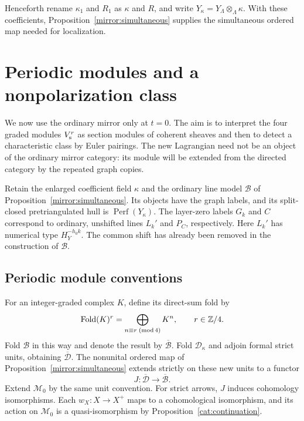 \documentclass[11pt]{article}
\theoremstyle{definition}
\theoremstyle{remark}
\newcommand{\Z}{\mathbb Z}
\DeclareMathOperator{\Perf}{Perf}
\numberwithin{equation}{section}
\begin{document}
Henceforth rename $\kappa_1$ and $R_1$ as $\kappa$ and $R$, and
write $Y_\kappa=Y_\Lambda\otimes_\Lambda\kappa$.  With these
coefficients, Proposition~\ref{mirror:simultaneous} supplies the
simultaneous ordered map needed for localization.

\section{Periodic modules and a nonpolarization class}
\label{per:section}

We now use the ordinary mirror only at $t=0$.  The aim is to interpret
the four graded modules $V_{\rm s}^r$ as section modules of coherent
sheaves and then to detect a characteristic class by Euler pairings.
The new Lagrangian need not be an object of the ordinary mirror
category: its module will be extended from the directed category by
the repeated graph copies.

Retain the enlarged coefficient field $\kappa$ and the ordinary line
model $\mathcal B$ of Proposition~\ref{mirror:simultaneous}.  Its objects
have the graph labels, and its split-closed pretriangulated hull is
$\Perf(Y_\kappa)$.  The layer-zero labels $G_k$ and $C$ correspond to
ordinary, unshifted lines $L_k'$ and $P_C$, respectively.  Here $L_k'$
has numerical type $H_Y^{-h_0k}$.  The common shift has already been
removed in the construction of $\mathcal B$.

\subsection{Periodic module conventions}

For an integer-graded complex $K$, define its direct-sum fold by
\begin{equation}
 \operatorname{Fold}(K)^r
   =\bigoplus_{n\equiv r\;({\rm mod}\,4)}K^n,
 \qquad r\in\Z/4.
 \label{per:fold}
\end{equation}
Fold $\mathcal B$ in this way and denote the result by
$\overline{\mathcal B}$.  Fold $\mathcal D_\kappa$ and adjoin formal
strict units, obtaining $\overline{\mathcal D}$.  The nonunital ordered
map of Proposition~\ref{mirror:simultaneous} extends strictly on these
new units to a functor
\begin{equation}
 J:\overline{\mathcal D}\longrightarrow\overline{\mathcal B}.
 \label{per:functor}
\end{equation}
Extend $\mathcal M_0$ by the same unit convention.  For strict arrows,
$J$ induces cohomology isomorphisms.  Each $w_X:X\to X^+$ maps to a
cohomological isomorphism, and its action on $\mathcal M_0$ is a
quasi-isomorphism by Proposition~\ref{cat:continuation}.
\end{document}
